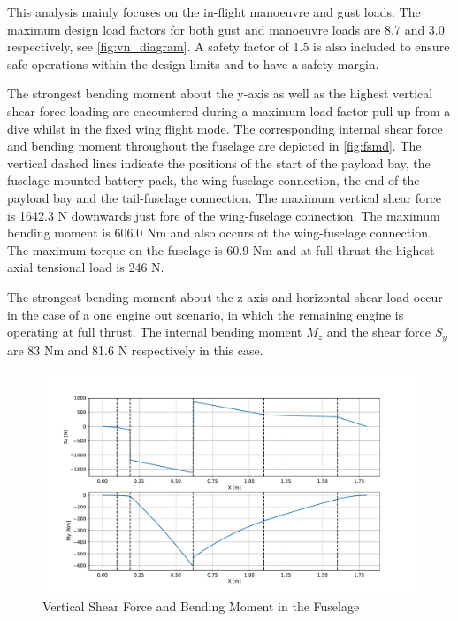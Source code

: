 This analysis mainly focuses on the in-flight manoeuvre and gust loads. The maximum design load factors for both gust and manoeuvre loads are 8.7 and 3.0 respectively, see \autoref{fig:vn_diagram}. A safety factor of 1.5 is also included to ensure safe operations within the design limits and to have a safety margin. 

The strongest bending moment about the y-axis as well as the highest vertical shear force loading are encountered during a maximum load factor pull up from a dive whilst in the fixed wing flight mode. The corresponding internal shear force and bending moment throughout the fuselage are depicted in \autoref{fig:fsmd}. The vertical dashed lines indicate the positions of the start of the payload bay, the fuselage mounted battery pack, the wing-fuselage connection, the end of the payload bay and the tail-fuselage connection. The maximum vertical shear force is 1642.3 N  downwards just  fore of the wing-fuselage connection. The maximum bending moment is 606.0 Nm and also occurs at the wing-fuselage connection. The maximum torque on the fuselage is 60.9 Nm and at full thrust the highest axial tensional load is 246 N.

The strongest bending moment about the z-axis and horizontal shear load occur in the case of a one engine out scenario, in which the remaining engine is operating at full thrust. The internal bending moment $M_{z}$ and the shear force $S_{y}$ are 83 Nm and 81.6 N respectively in this case.







\begin{figure}[H]
    \centering
    \includegraphics[width=1.1\textwidth]{Structures/Figures/fus_smd}
    \caption{Vertical Shear Force and Bending Moment in the Fuselage}
    \label{fig:fsmd}
\end{figure}



